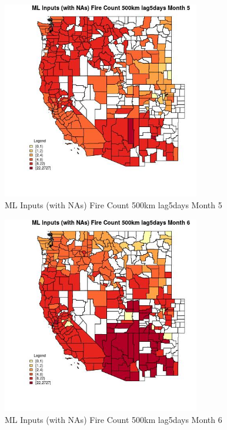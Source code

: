 \clearpage 

\begin{figure} 
\centering  
\includegraphics[width=0.77\textwidth]{Code_Outputs/Report_ML_input_PM25_Step4_part_f_de_duplicated_aves_prioritize_24hr_obswNAs_CountyFire_Count_500km_lag5daysmedianMonth5.jpg} 
\caption{\label{fig:Report_ML_input_PM25_Step4_part_f_de_duplicated_aves_prioritize_24hr_obswNAsCountyFire_Count_500km_lag5daysmedianMonth5}ML Inputs (with NAs) Fire Count 500km lag5days Month 5} 
\end{figure} 
 

\begin{figure} 
\centering  
\includegraphics[width=0.77\textwidth]{Code_Outputs/Report_ML_input_PM25_Step4_part_f_de_duplicated_aves_prioritize_24hr_obswNAs_CountyFire_Count_500km_lag5daysmedianMonth6.jpg} 
\caption{\label{fig:Report_ML_input_PM25_Step4_part_f_de_duplicated_aves_prioritize_24hr_obswNAsCountyFire_Count_500km_lag5daysmedianMonth6}ML Inputs (with NAs) Fire Count 500km lag5days Month 6} 
\end{figure} 
 

